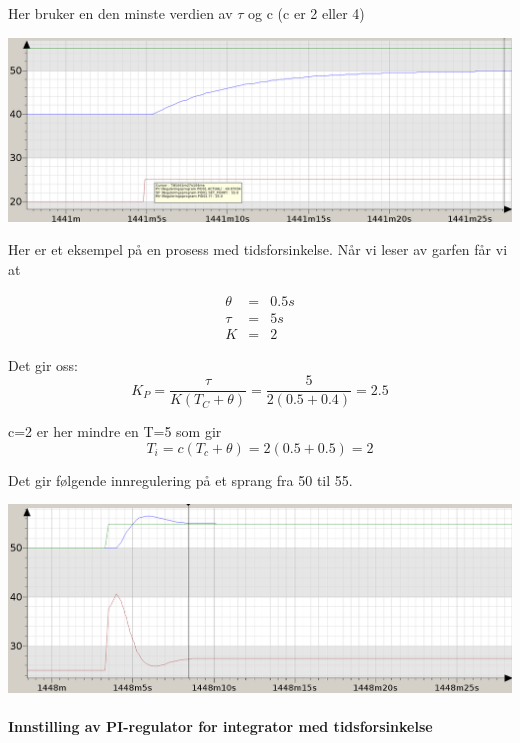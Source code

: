 \documentclass[10pt,a5paper]{article}
\begin{document}
Her bruker en den minste verdien av $\tau$ og c (c er 2 eller 4)

\includegraphics[width=1\textwidth]{Reg_step_response01}

Her er et eksempel på en prosess med tidsforsinkelse. Når vi leser
av garfen får vi at

\begin{eqnarray*}
\theta & = & 0.5s\\
\tau & = & 5s\\
K & = & 2
\end{eqnarray*}

Det gir oss:
\[
K_{P}=\dfrac{\tau}{K\left(T_{C}+\theta\right)}=\dfrac{5}{2(0.5+0.4)}=2.5
\]

c=2 er her mindre en T=5 som gir 
\[
T_{i}=c(T_{c}+\theta)=2(0.5+0.5)=2
\]

Det gir følgende innregulering på et sprang fra 50 til 55. 

\includegraphics[width=1\textwidth]{Reg_innreg_skogestad01}

\paragraph{Innstilling av PI-regulator for integrator med tidsforsinkelse}

~
\end{document}
